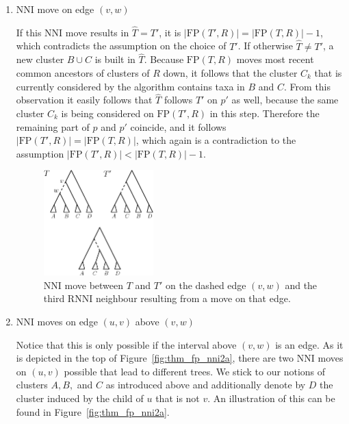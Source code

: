 \documentclass{amsart}
\newcommand{\rnni}{\mathrm{RNNI}}
\newcommand{\nni}{\mathrm{NNI}}
\newcommand{\fp}{\mathrm{FP}}
\begin{document}
\begin{enumerate}
\item $\nni$ move on edge $(v,w)$

If this $\nni$ move results in $\hat T = T'$, it is $|\fp(T',R)| = |\fp(T,R)| - 1$, which contradicts the assumption on the choice of $T'$.
If otherwise $\hat T \neq T'$, a new cluster $B \cup C$ is built in $\hat T$.
Because $\fp(T,R)$ moves most recent common ancestors of clusters of $R$ down, it follows that the cluster $C_k$ that is currently considered by the algorithm contains taxa in $B$ and $C$.
From this observation it easily follows that $\hat T$ follows $T'$ on $p'$ as well, because the same cluster $C_k$ is being considered on $\fp(T',R)$ in this step.
Therefore the remaining part of $p$ and $p'$ coincide, and it follows $|\fp(T',R)| = |\fp(T,R)|$, which again is a contradiction to the assumption $|\fp(T',R)| < |\fp(T,R)| - 1$.

\begin{figure}[!hbt]
\centering
\includegraphics[width=0.4\textwidth]{thm_fp_nni1}
\vspace{12pt}
\caption{$\nni$ move between $T$ and $T'$ on the dashed edge $(v,w)$ and the third $\rnni$ neighbour resulting from a move on that edge.}
\label{fig:thm_fp_nni1}
\end{figure}

\item $\nni$ moves on edge $(u,v)$ above $(v,w)$

Notice that this is only possible if the interval above $(v,w)$ is an edge.
As it is depicted in the top of Figure~\ref{fig:thm_fp_nni2a}, there are two $\nni$ moves on $(u,v)$ possible that lead to different trees.
We stick to our notions of clusters $A,B,$ and $C$ as introduced above and additionally denote by $D$ the cluster induced by the child of $u$ that is not $v$.
An illustration of this can be found in Figure~\ref{fig:thm_fp_nni2a}.


\end{enumerate}
\end{document}
